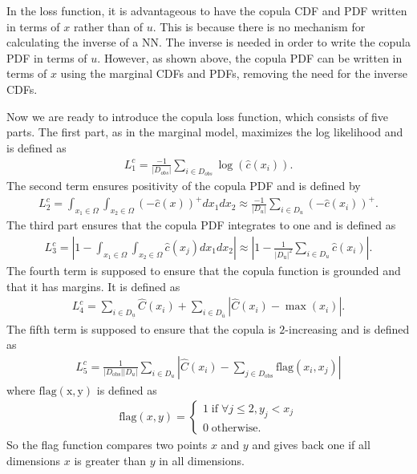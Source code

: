 In the loss function, it is advantageous to have the copula \gls{CDF} and \gls{PDF} written in terms of $x$ rather than of $u$. This is because there is no mechanism for calculating the inverse of a \gls{NN}. The inverse is needed in order to write the copula \gls{PDF} in terms of $u$. However, as shown above, the copula \gls{PDF} can be written in terms of $x$ using the marginal \gls{CDF}s and \gls{PDF}s, removing the need for the inverse \gls{CDF}s.   

Now we are ready to introduce the copula loss function, which consists of five parts. The first part, as in the marginal model, maximizes the log likelihood and is defined as
\begin{align*}
    L_1^c = \frac{-1}{|D_{obs}|} \sum_{i \in D_{obs}} \log(\hat{c}(x_i)).
\end{align*}
The second term ensures positivity of the copula \gls{PDF} and is defined by
\begin{align*}
    L_2^c = \int_{x_1\in\Omega}\int_{x_2\in\Omega} (-\hat{c}(x))^+dx_1dx_2 \approx \frac{-1}{|D_{u}|} \sum_{i \in D_{u}} (-\hat{c}(x_i))^+.
\end{align*}
The third part ensures that the copula PDF integrates to one and is defined as
\begin{align*}
    L_3^c = \left | 1- \int_{x_1\in\Omega}\int_{x_2\in\Omega} \hat{c}(x_j) dx_1 dx_2   \right | \approx \left | 1- \frac{1}{|D_{\mathrm{u}}|^2} \sum_{i \in D_{u}} \hat{c}(x_i)  \right |.
\end{align*}
The fourth term is supposed to ensure that the copula function is grounded and that it has margins. It is defined as
\begin{align*}
    L_4^c = \sum_{i \in D_{\underline{u}}} \hat{C}(x_i) + \sum_{i \in D_{\bar{u}}} \left| \hat{C}(x_i) - \max(x_i) \right|.
\end{align*}
The fifth term is supposed to ensure that the copula is $2$-increasing and is defined as
\begin{align*}
    L_5^c = \frac{1}{|D_{\mathrm{obs}}||D_{u}|} \sum_{i \in D_{u}} \left| \hat{C}(x_i) - \sum_{j\in D_{\mathrm{obs}}} \mathrm{flag}(x_i,x_j) \right|
\end{align*}
where $\mathrm{flag(x,y)}$ is defined as 
\begin{align*}
    \mathrm{flag}(x,y) =  
    \begin{cases}
        1 \; \mathrm{if} \; \forall j \leq 2, y_j < x_j\\
        0 \; \mathrm{otherwise}.
    \end{cases}
\end{align*}
So the flag function compares two points $x$ and $y$ and gives back one if all dimensions $x$ is greater than $y$ in all dimensions. 

